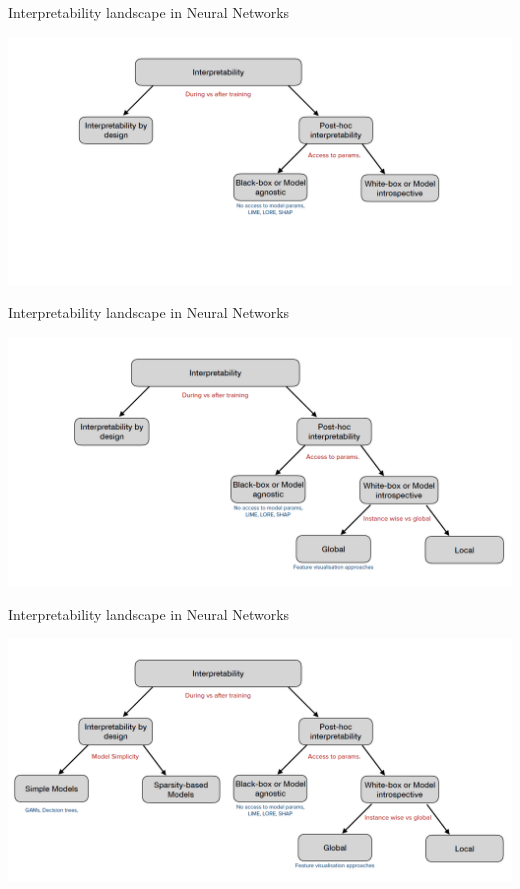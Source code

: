\documentclass[11pt,compress,t,notes=noshow, aspectratio=169, xcolor=table]{beamer}
\begin{document}
\begin{frame}[c]{Interpretability landscape in Neural Networks}
    
    \includegraphics[scale=.4]{baum2}
\end{frame}

\begin{frame}[c]{Interpretability landscape in Neural Networks}
    
    \includegraphics[scale=.4]{baum3}
\end{frame}

\begin{frame}[c]{Interpretability landscape in Neural Networks}
   
    \includegraphics[scale=.4]{baum4}
\end{frame}
\end{document}
